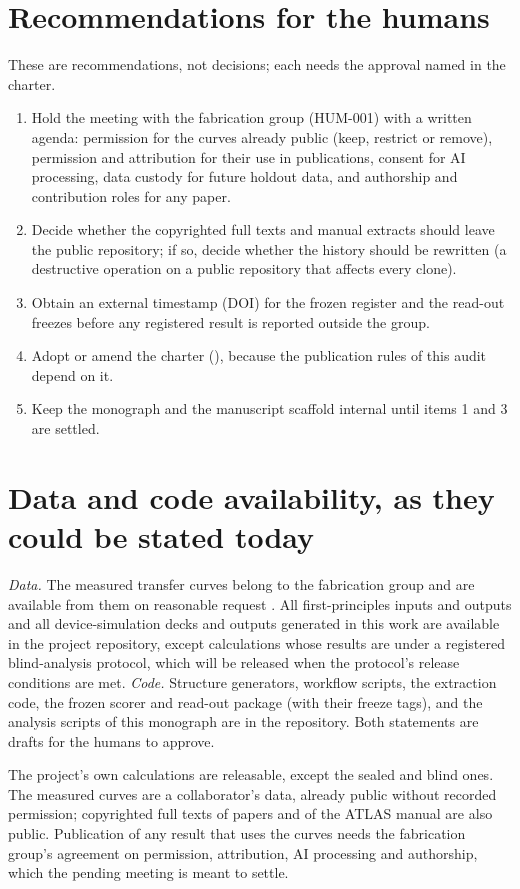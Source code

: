 \section{Recommendations for the humans}
\label{sec:mono-audit-reco}

These are recommendations, not decisions; each needs the approval named in the charter.
\begin{enumerate}
\item Hold the meeting with the fabrication group (HUM-001) with a written agenda: permission for the curves already
public (keep, restrict or remove), permission and attribution for their use in publications, consent for AI processing,
data custody for future holdout data, and authorship and contribution roles for any paper.
\item Decide whether the copyrighted full texts and manual extracts should leave the public repository; if so, decide
whether the history should be rewritten (a destructive operation on a public repository that affects every clone).
\item Obtain an external timestamp (DOI) for the frozen register and the read-out freezes before any registered result is
reported outside the group.
\item Adopt or amend the charter (), because the publication rules of this audit depend on it.
\item Keep the monograph and the manuscript scaffold internal until items 1 and 3 are settled.
\end{enumerate}

\section{Data and code availability, as they could be stated today}
\label{sec:mono-audit-availability}

\emph{Data.} The measured transfer curves belong to the fabrication group and are available from them on reasonable
request \citep[p.~10]{Januar2026}. All first-principles inputs and outputs and all device-simulation decks and outputs generated
in this work are available in the project repository, except calculations whose results are under a registered
blind-analysis protocol, which will be released when the protocol's release conditions are met. \emph{Code.} Structure
generators, workflow scripts, the extraction code, the frozen scorer and read-out package (with their freeze tags), and
the analysis scripts of this monograph are in the repository. Both statements are drafts for the humans to approve.

\begin{keyresult}
The project's own calculations are releasable, except the sealed and blind ones. The measured curves are a
collaborator's data, already public without recorded permission; copyrighted full texts of papers and of the ATLAS
manual are also public. Publication of any result that uses the curves needs the fabrication group's agreement on
permission, attribution, AI processing and authorship, which the pending meeting is meant to settle.
\end{keyresult}
